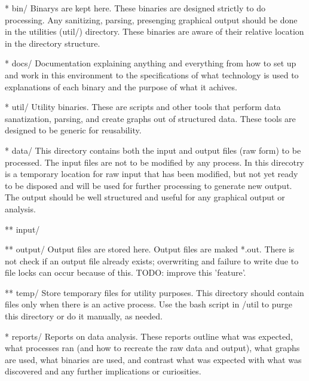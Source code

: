 \documentclass{article}
\begin{document}
* bin/ 
  Binarys are kept here. These binaries are designed strictly to do processing. Any sanitizing, parsing, presenging graphical output should be done in the utilities (util/) directory. These binaries are aware of their relative location in the directory structure. 
 
* docs/ 
  Documentation explaining anything and everything from how to set up and work in this environment to the specifications of what technology is used to explanations of each binary and the purpose of what it achives.  
 
* util/  
        Utility binaries. These are scripts and other tools that perform data sanatization, parsing, and create graphs out of structured data. These tools are designed to be generic for reusability. 
 
* data/ 
  This directory contains both the input and output files (raw form) to be processed. The input files are not to be modified by any process. In this direcotry is a temporary location for raw input that has been modified, but not yet ready to be disposed and will be used for further processing to generate new output. The output should be well structured and useful for any graphical output or analysis. 
 
** input/ 
 
** output/ 
  Output files are stored here. Output files are maked *.out. There is not check if an output file already exists; overwriting and failure to write due to file locks can occur because of this. TODO: improve this 'feature'. 
 
** temp/ 
  Store temporary files for utility purposes. This directory should contain files only when there is an active process. Use the bash script in /util to purge this directory or do it manually, as needed. 
 
* reports/ 
  Reports on data analysis. These reports outline what was expected, what processes ran (and how to recreate the raw data and output), what graphs are used, what binaries are used, and contrast what was expected with what was discovered and any further implications or curiosities.
 
\end{document}
